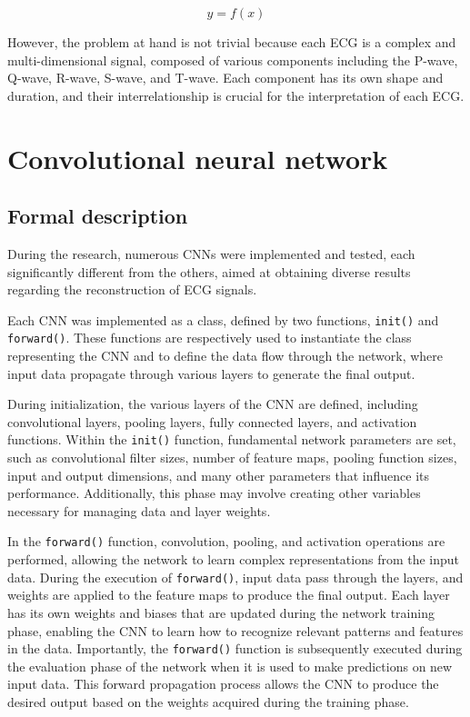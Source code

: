 \documentclass[12pt,english]{report}
\begin{document}
\begin{equation}
    y = f(x)
    \label{eq:modello}
\end{equation}

However, the problem at hand is not trivial because each ECG is a complex and multi-dimensional signal, composed of various components including the P-wave, Q-wave, R-wave, S-wave, and T-wave. Each component has its own shape and duration, and their interrelationship is crucial for the interpretation of each ECG.

\section{Convolutional neural network}
\label{sec:network}

\subsection{Formal description}
\label{subsec:descrizione}

During the research, numerous CNNs were implemented and tested, each significantly different from the others, aimed at obtaining diverse results regarding the reconstruction of ECG signals.

Each CNN was implemented as a class, defined by two functions, \texttt{init()} and \texttt{forward()}. These functions are respectively used to instantiate the class representing the CNN and to define the data flow through the network, where input data propagate through various layers to generate the final output.

During initialization, the various layers of the CNN are defined, including convolutional layers, pooling layers, fully connected layers, and activation functions. Within the \texttt{init()} function, fundamental network parameters are set, such as convolutional filter sizes, number of feature maps, pooling function sizes, input and output dimensions, and many other parameters that influence its performance. Additionally, this phase may involve creating other variables necessary for managing data and layer weights.

In the \texttt{forward()} function, convolution, pooling, and activation operations are performed, allowing the network to learn complex representations from the input data. During the execution of \texttt{forward()}, input data pass through the layers, and weights are applied to the feature maps to produce the final output. Each layer has its own weights and biases that are updated during the network training phase, enabling the CNN to learn how to recognize relevant patterns and features in the data. Importantly, the \texttt{forward()} function is subsequently executed during the evaluation phase of the network when it is used to make predictions on new input data. This forward propagation process allows the CNN to produce the desired output based on the weights acquired during the training phase.
\end{document}
